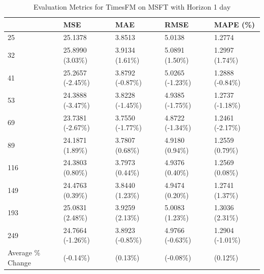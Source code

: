 \begin{table}
\caption{Evaluation Metrics for TimesFM on MSFT with Horizon 1 day}
\label{tab:fm_MSFT_h1_metrics}
\begin{tabular}{lllll}
\toprule
 & MSE & MAE & RMSE & MAPE (\%) \\
\midrule
25 & 25.1378 & 3.8513 & 5.0138 & 1.2774 \\
32 & 25.8990 (3.03\%) & 3.9134 (1.61\%) & 5.0891 (1.50\%) & 1.2997 (1.74\%) \\
41 & 25.2657 (-2.45\%) & 3.8792 (-0.87\%) & 5.0265 (-1.23\%) & 1.2888 (-0.84\%) \\
53 & 24.3888 (-3.47\%) & 3.8228 (-1.45\%) & 4.9385 (-1.75\%) & 1.2737 (-1.18\%) \\
69 & 23.7381 (-2.67\%) & 3.7550 (-1.77\%) & 4.8722 (-1.34\%) & 1.2461 (-2.17\%) \\
89 & 24.1871 (1.89\%) & 3.7807 (0.68\%) & 4.9180 (0.94\%) & 1.2559 (0.79\%) \\
116 & 24.3803 (0.80\%) & 3.7973 (0.44\%) & 4.9376 (0.40\%) & 1.2569 (0.08\%) \\
149 & 24.4763 (0.39\%) & 3.8440 (1.23\%) & 4.9474 (0.20\%) & 1.2741 (1.37\%) \\
193 & 25.0831 (2.48\%) & 3.9259 (2.13\%) & 5.0083 (1.23\%) & 1.3036 (2.31\%) \\
249 & 24.7664 (-1.26\%) & 3.8923 (-0.85\%) & 4.9766 (-0.63\%) & 1.2904 (-1.01\%) \\
Average \% Change & (-0.14\%) & (0.13\%) & (-0.08\%) & (0.12\%) \\
\bottomrule
\end{tabular}
\end{table}
